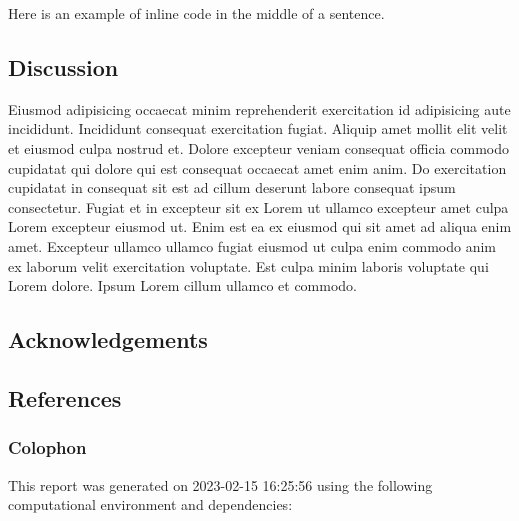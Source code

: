 \documentclass[
  super,
  preprint,
  3p]{elsarticle}
\newlength{\cslhangindent}
\newlength{\cslentryspacingunit} %
\newenvironment{CSLReferences}[2] %
 {%
  \setlength{\parindent}{0pt}
  \ifodd #1
  \let\oldpar\par
  \def\par{\hangindent=\cslhangindent\oldpar}
  \fi
  \setlength{\parskip}{#2\cslentryspacingunit}
 }%
 {}
\begin{document}
\newpage{}

Here is an example of inline code in the middle of a sentence.

\hypertarget{discussion}{%
\subsection{Discussion}\label{discussion}}

Eiusmod adipisicing occaecat minim reprehenderit exercitation id
adipisicing aute incididunt. Incididunt consequat exercitation fugiat.
Aliquip amet mollit elit velit et eiusmod culpa nostrud et. Dolore
excepteur veniam consequat officia commodo cupidatat qui dolore qui est
consequat occaecat amet enim anim. Do exercitation cupidatat in
consequat sit est ad cillum deserunt labore consequat ipsum consectetur.
Fugiat et in excepteur sit ex Lorem ut ullamco excepteur amet culpa
Lorem excepteur eiusmod ut. Enim est ea ex eiusmod qui sit amet ad
aliqua enim amet. Excepteur ullamco ullamco fugiat eiusmod ut culpa enim
commodo anim ex laborum velit exercitation voluptate. Est culpa minim
laboris voluptate qui Lorem dolore. Ipsum Lorem cillum ullamco et
commodo.

\newpage{}

\hypertarget{acknowledgements}{%
\subsection{Acknowledgements}\label{acknowledgements}}

\newpage{}

\newpage{}

\hypertarget{references}{%
\subsection{References}\label{references}}

\hypertarget{refs}{}
\begin{CSLReferences}{0}{0}
\end{CSLReferences}

\newpage{}

\hypertarget{colophon}{%
\subsubsection{Colophon}\label{colophon}}

This report was generated on 2023-02-15 16:25:56 using the following
computational environment and dependencies:
\end{document}
